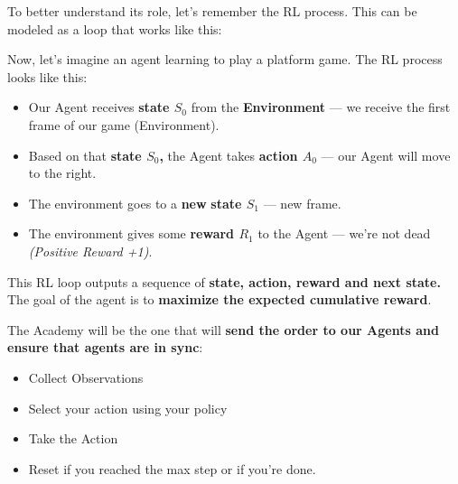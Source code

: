 \documentclass[11pt,a4paper]{article}
\begin{document}
To better understand its role, let's remember the RL process. This can be modeled as a loop that works like this:


Now, let's imagine an agent learning to play a platform game. The RL process looks like this:


\begin{itemize}
\tightlist
\item
  Our Agent receives \textbf{state \(S_0\)} from the \textbf{Environment} --- we receive the first frame of our game (Environment).
\item
  Based on that \textbf{state \(S_0\),} the Agent takes \textbf{action \(A_0\)} --- our Agent will move to the right.
\item
  The environment goes to a \textbf{new} \textbf{state \(S_1\)} --- new frame.
\item
  The environment gives some \textbf{reward \(R_1\)} to the Agent --- we're not dead \emph{(Positive Reward +1)}.
\end{itemize}

This RL loop outputs a sequence of \textbf{state, action, reward and next state.} The goal of the agent is to \textbf{maximize the expected cumulative reward}.

The Academy will be the one that will \textbf{send the order to our Agents and ensure that agents are in sync}:

\begin{itemize}
\tightlist
\item
  Collect Observations
\item
  Select your action using your policy
\item
  Take the Action
\item
  Reset if you reached the max step or if you're done.
\end{itemize}
\end{document}
